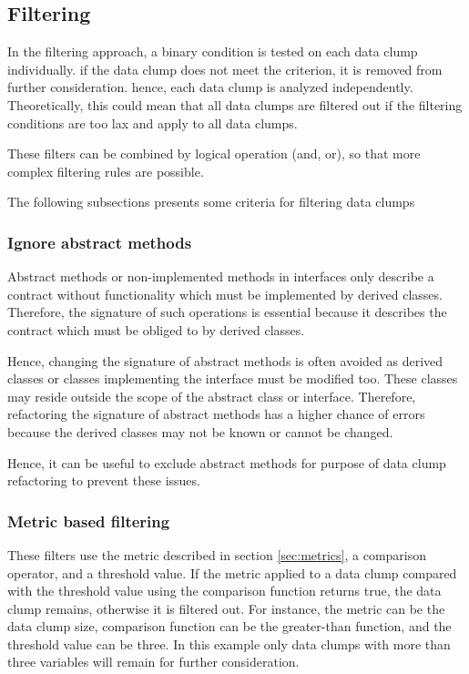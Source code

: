 \subsection{Filtering}
In the filtering approach, a binary condition is tested on each data clump individually. if the data clump does not meet the criterion, it is removed from further consideration. hence, each data clump is analyzed independently. Theoretically, this could mean that all data clumps are filtered out if the filtering conditions are too lax and apply to all data clumps. 

These filters can be combined by logical operation (and, or), so that more complex filtering rules are possible. 

The following subsections presents some  criteria for filtering data clumps
\subsubsection{Ignore abstract methods}

Abstract methods or non-implemented methods in interfaces only describe a contract without functionality which must be implemented by derived classes. Therefore, the signature of such operations is essential because it describes the contract which must be obliged to by derived classes.

Hence, changing the signature of abstract methods is often avoided as derived classes or classes implementing the interface must be modified too. These classes may reside outside the scope of the abstract class or interface. Therefore, refactoring the signature of abstract methods has a higher chance of errors because the derived classes may not be known or cannot be changed. 

Hence, it can be useful to exclude abstract methods for purpose of data clump refactoring to prevent these issues. 

\subsubsection{Metric based filtering}

These filters use the metric described in section \ref{sec:metrics}, a comparison operator, and a threshold value. If the metric applied to a data clump compared with the threshold value using the comparison function returns true, the data clump remains, otherwise it is filtered out. For instance, the metric can be the data clump size, comparison function can be the greater-than function, and the threshold value can be three. In this example only data clumps with more than three variables will remain for further consideration. 

